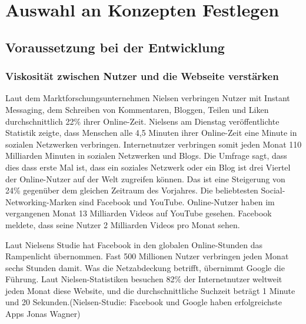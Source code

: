 
\chapter{Auswahl an Konzepten Festlegen}


\section{Voraussetzung bei der Entwicklung}


\subsection{Viskosität zwischen Nutzer und die Webseite verstärken}


Laut dem Marktforschungsunternehmen Nielsen verbringen Nutzer mit Instant Messaging, dem Schreiben von Kommentaren, Bloggen, Teilen und \glqq{}Liken\grqq{} durchschnittlich 22\% ihrer Online-Zeit. Nielsens am Dienstag veröffentlichte Statistik zeigte, dass Menschen alle 4,5 Minuten ihrer Online-Zeit eine Minute in sozialen Netzwerken verbringen. Internetnutzer verbringen somit jeden Monat 110 Milliarden Minuten in sozialen Netzwerken und Blogs. Die Umfrage sagt, dass dies dass erste Mal ist, dass ein soziales Netzwerk oder ein Blog \glqq{}ist drei Viertel der Online-Nutzer auf der Welt zugreifen können.\grqq{} Das ist eine Steigerung von 24\% gegenüber dem gleichen Zeitraum des Vorjahres. Die beliebtesten Social-Networking-Marken sind Facebook und YouTube. Online-Nutzer haben im vergangenen Monat 13 Milliarden Videos auf YouTube gesehen. Facebook meldete, dass seine Nutzer 2 Milliarden Videos pro Monat sehen.


Laut Nielsens Studie hat Facebook in den globalen Online-Stunden das Rampenlicht übernommen. Fast 500 Millionen Nutzer verbringen jeden Monat sechs Stunden damit.
Was die Netzabdeckung betrifft, übernimmt Google die Führung. Laut Nielsen-Statistiken besuchen 82\% der Internetnutzer weltweit jeden Monat diese Website, und die durchschnittliche Suchzeit beträgt 1 Minute und 20 Sekunden.(Nielsen-Studie: Facebook und Google haben erfolgreichste Apps Jonas Wagner)

